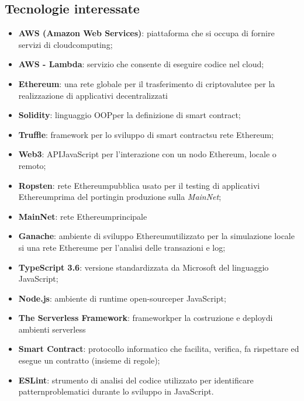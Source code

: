 \subsection{Tecnologie interessate}
\begin{itemize}
	\item \textbf{AWS (Amazon Web Services)}: piattaforma che si occupa di fornire servizi di cloud\glo computing\glos;
	\item \textbf{AWS - Lambda}: servizio che consente di eseguire codice nel cloud\glos;
	\item \textbf{Ethereum\glos}: una rete globale per il trasferimento di criptovalute\glo e per la realizzazione di applicativi decentralizzati
	\item \textbf{Solidity}: linguaggio OOP\glo per la definizione di smart contract\glos;
	\item \textbf{Truffle}: framework per lo sviluppo di smart contract\glo su rete Ethereum\glos;
	\item \textbf{Web3}: API\glo JavaScript per l'interazione con un nodo Ethereum\glos, locale o remoto;
	\item \textbf{Ropsten}: rete Ethereum\glo pubblica usato per il testing di applicativi Ethereum\glo prima del porting\glo in produzione sulla \textit{MainNet};
	\item \textbf{MainNet}: rete Ethereum\glo principale
	\item \textbf{Ganache}: ambiente di sviluppo Ethereum\glo utilizzato per la simulazione locale si una rete Ethereum\glo e per l'analisi delle transazioni e log;
	\item \textbf{TypeScript 3.6}: versione standardizzata da Microsoft del linguaggio JavaScript;
	\item \textbf{Node.js}: ambiente di runtime open-source\glo per JavaScript;
	\item \textbf{The Serverless Framework}: framework\glo per la costruzione e deploy\glo di ambienti serverless\glo
	\item \textbf{Smart Contract}: protocollo informatico che facilita, verifica, fa rispettare ed esegue un contratto (insieme di regole);
	\item \textbf{ESLint}: strumento di analisi del codice utilizzato per identificare pattern\glo problematici durante lo sviluppo in JavaScript.
\end{itemize}

